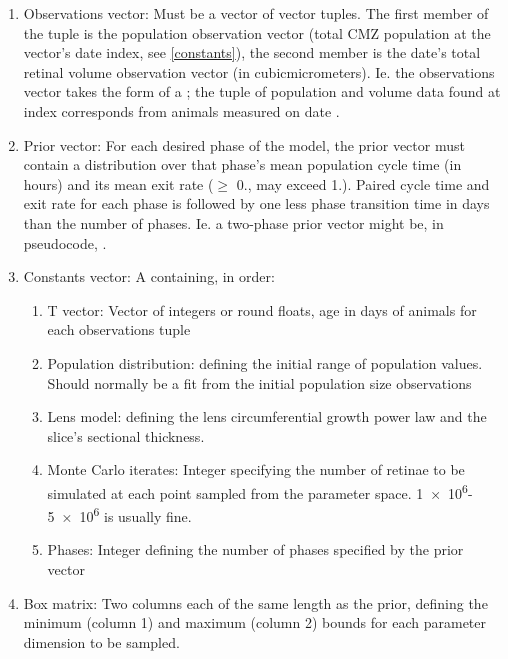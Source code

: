 \documentclass{ut-thesis}
\begin{document}
\begin{NoHyper}
\begin{enumerate}
    \item Observations vector: Must be a vector of vector tuples. The first member of the tuple is the population observation vector (total CMZ population at the vector's date index, see \ref{constants}), the second member is the date's total retinal volume observation vector (in \si{cubic}{micro}{meters}). Ie. the observations vector takes the form of a ; the tuple of population and volume data found at index  corresponds from animals measured on date .
    \item Prior vector: For each desired phase of the model, the prior vector must contain a distribution over that phase's mean population cycle time (in hours) and its mean exit rate ($\geq$ 0., may exceed 1.). Paired cycle time and exit rate for each phase is followed by one less phase transition time in days than the number of phases. Ie. a two-phase prior vector might be, in pseudocode, . 
    \item\label{constants} Constants vector: A  containing, in order:
    \begin{enumerate}
        \item T vector: Vector of integers or round floats, age in days of animals for each observations tuple
        \item Population distribution:  defining the initial range of population values. Should normally be a fit from the initial population size observations
        \item Lens model:   defining the lens circumferential growth power law and the slice's sectional thickness.
        \item Monte Carlo iterates: Integer specifying the number of retinae to be simulated at each point sampled from the parameter space. \num{1e6}-\num{5e6} is usually fine.
        \item Phases: Integer defining the number of phases specified by the prior vector
    \end{enumerate}
    \item Box matrix: Two columns each of the same length as the prior, defining the minimum (column 1) and maximum (column 2) bounds for each parameter dimension to be sampled.
\end{enumerate}


\end{NoHyper}
\end{document}
